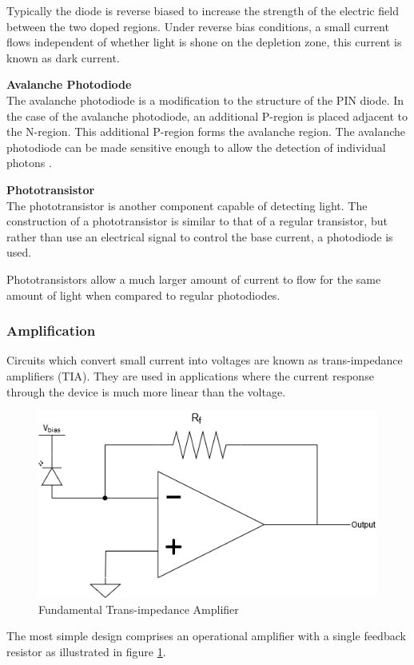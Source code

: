 Typically the diode is reverse biased to increase the strength of the electric field between the two doped regions. Under reverse bias conditions, a small current flows independent of whether light is shone on the depletion zone, this current is known as dark current.

\textbf{Avalanche Photodiode}\\
The avalanche photodiode is a modification to the structure of the PIN diode. In the case of the avalanche photodiode, an additional P-region is placed adjacent to the N-region. This additional P-region forms the avalanche region. The avalanche photodiode can be made sensitive enough to allow the detection of individual photons \cite{Perenzoni2018}.

\textbf{Phototransistor}\\
The phototransistor is another component capable of detecting light. The construction of a phototransistor is similar to that of a regular transistor, but rather than use an electrical signal to control the base current, a photodiode is used.

Phototransistors allow a much larger amount of current to flow for the same amount of light when compared to regular photodiodes.

\subsubsection{Amplification}

Circuits which convert small current into voltages are known as trans-impedance amplifiers (TIA). They are used in applications where the current response through the device is much more linear than the voltage.

\begin{figure}[H]
	\centering
	\includegraphics[width=0.6\linewidth]{figures/litreview/transimpedance_amplifier.png}
	\caption{Fundamental Trans-impedance Amplifier}
	\label{fig:transimpedance_amplifier}
\end{figure}

The most simple design comprises an operational amplifier with a single feedback resistor as illustrated in figure \ref{fig:transimpedance_amplifier}.

